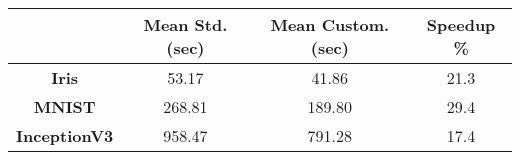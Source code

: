 \scriptsize

\begin{tabular}{|c|c|c|c|} 
\hline
 & \textbf{Mean Std. (sec)} & \textbf{Mean Custom. (sec)} & \textbf{Speedup \%}\\
\hline
\textbf{Iris} & 53.17 & 41.86 &  21.3\\
\hline
\textbf{MNIST} & 268.81 & 189.80 & 29.4 \\
\hline
\textbf{InceptionV3} & 958.47 & 791.28 & 17.4 \\
\hline
\end{tabular}
